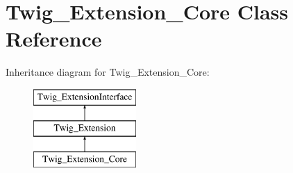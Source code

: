 \hypertarget{classTwig__Extension__Core}{}\section{Twig\+\_\+\+Extension\+\_\+\+Core Class Reference}
\label{classTwig__Extension__Core}
Inheritance diagram for Twig\+\_\+\+Extension\+\_\+\+Core\+:\begin{figure}[H]
\begin{center}
\leavevmode
\includegraphics[height=3.000000cm]{classTwig__Extension__Core}
\end{center}
\end{figure}
